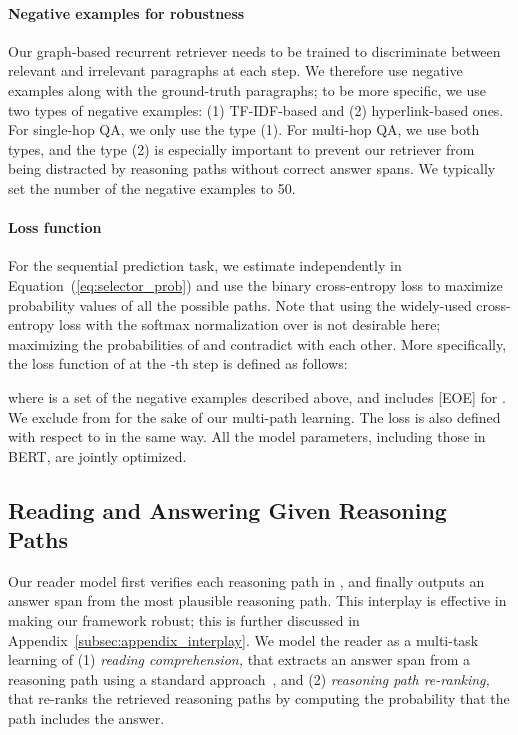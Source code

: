 \documentclass{article} \usepackage{iclr2020_conference,times}
\begin{document}
\vspace{-2mm}\paragraph{Negative examples for robustness}
Our graph-based recurrent retriever needs to be trained to discriminate between relevant and irrelevant paragraphs at each step.
We therefore use negative examples along with the ground-truth paragraphs; to be more specific, we use two types of negative examples: (1) TF-IDF-based and (2) hyperlink-based ones.
For single-hop QA, we only use the type (1).
For multi-hop QA, we use both types, and the type (2) is especially important to prevent our retriever from being distracted by reasoning paths without correct answer spans.
We typically set the number of the negative examples to 50.


\vspace{-2mm}\paragraph{Loss function}
For the sequential prediction task, we estimate  independently in Equation~(\ref{eq:selector_prob}) and use the binary cross-entropy loss to maximize probability values of all the possible paths.
Note that using the widely-used cross-entropy loss with the softmax normalization over  is not desirable here; maximizing the probabilities of  and  contradict with each other.
More specifically, the loss function of  at the -th step is defined as follows:

where  is a set of the negative examples described above, and includes [EOE] for .
We exclude  from  for the sake of our multi-path learning.
The loss is also defined with respect to  in the same way.
All the model parameters, including those in BERT, are jointly optimized.

\subsection{Reading and Answering Given Reasoning Paths}
\label{sec:reader}
Our reader model first verifies each reasoning path in , and finally outputs an answer span  from the most plausible reasoning path.
This interplay is effective in making our framework robust; this is further discussed in Appendix~\ref{subsec:appendix_interplay}.
We model the reader as a multi-task learning of (1) {\it reading comprehension,} that extracts an answer span from a reasoning path  using a standard approach~\citep{seo2016bidirectional,xiong2017dynamic,devlin2018bert}, and (2) {\it reasoning path re-ranking,} that re-ranks the retrieved reasoning paths by computing the probability that the path includes the answer.
\end{document}
